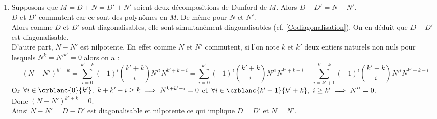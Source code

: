 \documentclass[8pt]{book}
\begin{document}
\begin{enumerate}
$$\begin{pmatrix}
			N_{\lambda_1}& & & & \\
			& \ddots & & 0 & \\
			& & N_{\lambda_i} & & \\
			& 0 & & \ddots & \\
			& & & & N_{\lambda_p}
		\end{pmatrix}P^{-1}$$ où $P$ désigne la matrice de passage de la base $\B$ à la base canonique de $\C^n$.
		On peut alors affirmer que $D$ est diagonalisable ($P^{-1}DP$ est diagonale), que $N$ est nilpotente car $N^k=P\begin{pmatrix}
			N_{\lambda_1}^k& & & & \\
			& \ddots & & 0 & \\
			& & N_{\lambda_i}^k & & \\
			& 0 & & \ddots & \\
			& & & & N_{\lambda_p}^k
		\end{pmatrix}P^{-1}=0$ pour $k$ le $\ppcm$ des indices de nilpotence de $N_{\lambda_1},\dots,N_{\lambda_p}$ par exemple, et que $N$ et $D$ commutent :
		$$DN=P\begin{pmatrix}
			\lambda_1N_{\lambda_1}& & & & \\
			& \ddots & & 0 & \\
			& & \lambda_iN_{\lambda_i} & & \\
			& 0 & & \ddots & \\
			& & & & \lambda_pN_{\lambda_p}
		\end{pmatrix}P^{-1}=ND$$
		\item Supposons que $M=D+N=D'+N'$ soient deux décompositions de Dunford de $M$. Alors $D-D'=N-N'$.\\
		$D$ et $D'$ commutent car ce sont des polynômes en $M$. De même pour $N$ et $N'$.\\
		Alors comme $D$ et $D'$ sont diagonalisables, elle sont simultanément diagonalisables (cf. \ref{Codiagonalisation}). On en déduit que $D-D'$ est diagonalisable.\\
		D'autre part, $N-N'$ est nilpotente. En effet comme $N$ et $N'$ commutent, si l'on note $k$ et $k'$ deux entiers naturels non nuls pour lesquels $N^k={N'}^{k'}=0$ alors on a :
		$$(N-N')^{k'+k}=\sum_{i=0}^{k'+k}(-1)^i\binom{k'+k}{i}{N'}^iN^{k'+k-i}=\sum_{i=0}^{k'}(-1)^i\binom{k'+k}{i}{N'}^iN^{k'+k-i}+\sum_{i=k'+1}^{k'+k}(-1)^i\binom{k'+k}{i}{N'}^iN^{k'+k-i}$$
		Or $\forall i\in \crblanc{0}{k'},\ k+k'-i\geq k\implies N^{k+k'-i}=0$ et $\forall i\in \crblanc{k'+1}{k'+k},\ i\geq k'\implies {N'}^i=0$.\\
		Donc $(N-N')^{k'+k}=0$.\\
		Ainsi $N-N'=D-D'$ est diagonalisable et nilpotente ce qui implique $D=D'$ et $N=N'$.
	\end{enumerate}
	
\end{document}

